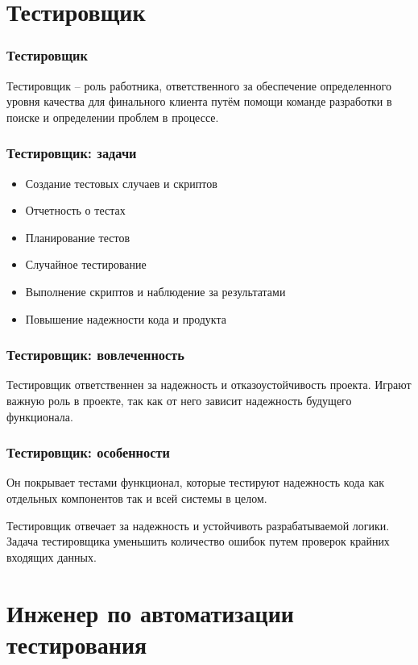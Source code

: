 \documentclass{../industrial-development}
\begin{document}
	\section{Тестировщик }
	
	\begin{frame} \frametitle{Тестировщик}
		\begin{block}{}
			\alert {Тестировщик} – роль работника, ответственного за обеспечение определенного уровня качества для финального клиента путём помощи команде разработки в поиске и определении проблем в процессе.
		\end{block}
		
	\end{frame}
	
	\begin{frame} \frametitle{Тестировщик: задачи}
		\begin{itemize}
			\item Создание тестовых случаев и скриптов
			\item Отчетность о тестах
			\item Планирование тестов
			\item Случайное тестирование
			\item Выполнение скриптов и наблюдение за результатами 
			\item Повышение надежности кода и продукта
		\end{itemize}
	\end{frame}
	
	\begin{frame} \frametitle{Тестировщик: вовлеченность}
		Тестировщик ответственнен за надежность и отказоустойчивость проекта. Играют важную роль в проекте, так как от него зависит надежность будущего функционала.
	\end{frame}
	
	\begin{frame} \frametitle{Тестировщик: особенности}
		Он покрывает тестами функционал, которые тестируют надежность кода как отдельных компонентов так и всей системы в целом. 
	\end{frame}
	
	\lecturenotes
		Тестировщик отвечает за надежность и устойчивоть разрабатываемой логики. Задача тестировщика уменьшить количество ошибок путем проверок крайних входящих данных. 
	
	\section{Инженер по автоматизации тестирования}
	
\end{document}
